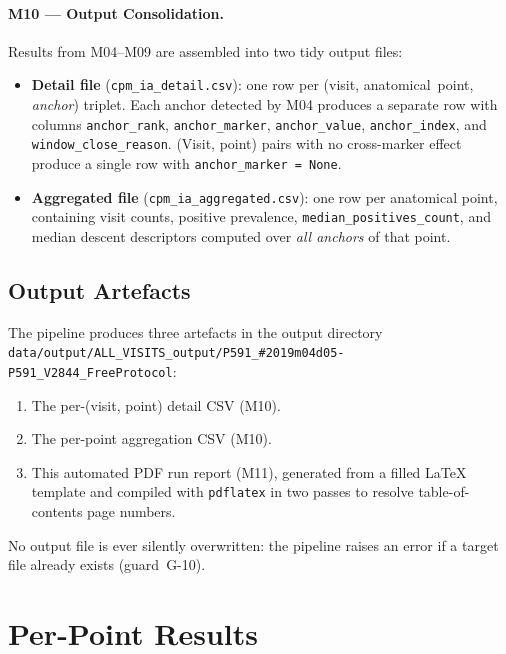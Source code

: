 \documentclass[a4paper,11pt]{article}
\begin{document}
\paragraph{M10 --- Output Consolidation.}
Results from M04--M09 are assembled into two tidy output files:
\begin{itemize}
  \item \textbf{Detail file} (\texttt{cpm\_ia\_detail.csv}): one row per
        (visit, anatomical~point, \emph{anchor}) triplet. Each anchor detected by M04
        produces a separate row with columns \texttt{anchor\_rank},
        \texttt{anchor\_marker}, \texttt{anchor\_value}, \texttt{anchor\_index},
        and \texttt{window\_close\_reason}.
        (Visit, point) pairs with no cross-marker effect produce a single row with
        \texttt{anchor\_marker = None}.
  \item \textbf{Aggregated file} (\texttt{cpm\_ia\_aggregated.csv}): one row per
        anatomical point, containing visit counts, positive prevalence,
        \texttt{median\_positives\_count}, and median descent descriptors computed over
        \emph{all anchors} of that point.
\end{itemize}

\subsection{Output Artefacts}

The pipeline produces three artefacts in the output directory \texttt{data/output/ALL\_VISITS\_output/P591\_\#2019m04d05-P591\_V2844\_FreeProtocol}:
\begin{enumerate}
  \item The per-(visit, point) detail CSV (M10).
  \item The per-point aggregation CSV (M10).
  \item This automated PDF run report (M11), generated from a filled \LaTeX{} template
        and compiled with \texttt{pdflatex} in two passes to resolve table-of-contents
        page numbers.
\end{enumerate}
No output file is ever silently overwritten: the pipeline raises an error if a target
file already exists (guard~G-10).

\section{Per-Point Results}
\end{document}
